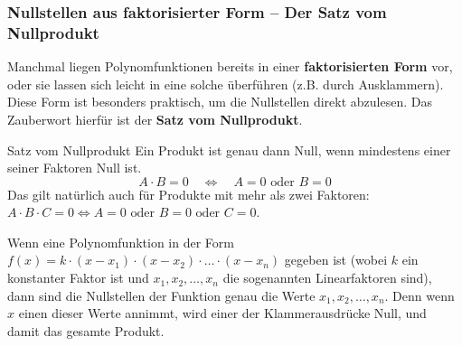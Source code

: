 \subsubsection{Nullstellen aus faktorisierter Form – Der Satz vom Nullprodukt}
\label{subsec:nullprodukt}

Manchmal liegen Polynomfunktionen bereits in einer \textbf{faktorisierten Form} vor, oder sie lassen sich leicht in eine solche überführen (z.B. durch Ausklammern). Diese Form ist besonders praktisch, um die Nullstellen direkt abzulesen. Das Zauberwort hierfür ist der \textbf{Satz vom Nullprodukt}.

\begin{merksatzumgebung}{Satz vom Nullprodukt}
Ein Produkt ist genau dann Null, wenn mindestens einer seiner Faktoren Null ist.
\[ A \cdot B = 0 \quad \Leftrightarrow \quad A=0 \text{ oder } B=0 \]
Das gilt natürlich auch für Produkte mit mehr als zwei Faktoren: $A \cdot B \cdot C = 0 \Leftrightarrow A=0 \text{ oder } B=0 \text{ oder } C=0$.
\end{merksatzumgebung}

Wenn eine Polynomfunktion in der Form $f(x) = k \cdot (x-x_1) \cdot (x-x_2) \cdot \dots \cdot (x-x_n)$ gegeben ist (wobei $k$ ein konstanter Faktor ist und $x_1, x_2, \dots, x_n$ die sogenannten Linearfaktoren sind), dann sind die Nullstellen der Funktion genau die Werte $x_1, x_2, \dots, x_n$. Denn wenn $x$ einen dieser Werte annimmt, wird einer der Klammerausdrücke Null, und damit das gesamte Produkt.

